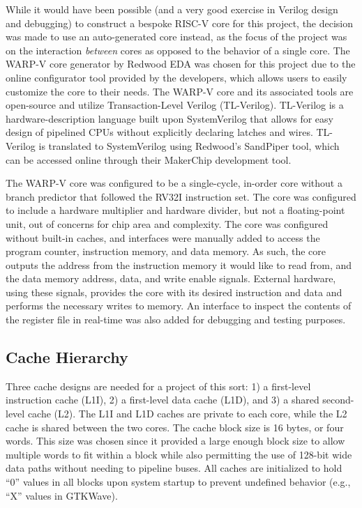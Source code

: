 \documentclass[10pt, compsoc]{IEEEtran}
\begin{document}
While it would have been possible (and a very good exercise in Verilog design and debugging) to construct a bespoke RISC-V core for this project, the decision was made to use an auto-generated core instead, as the focus of the project was on the interaction \textit{between} cores as opposed to the behavior of a single core. The WARP-V core generator by Redwood EDA \cite{warpv} was chosen for this project due to the online configurator tool provided by the developers, which allows users to easily customize the core to their needs. The WARP-V core and its associated tools are open-source and utilize Transaction-Level Verilog (TL-Verilog). TL-Verilog \cite{tlx} is a hardware-description language built upon SystemVerilog that allows for easy design of pipelined CPUs without explicitly declaring latches and wires. TL-Verilog is translated to SystemVerilog using Redwood's SandPiper tool, which can be accessed online through their MakerChip development tool. 



The WARP-V core was configured to be a single-cycle, in-order core without a branch predictor that followed the RV32I instruction set. The core was configured to include a hardware multiplier and hardware divider, but not a floating-point unit, out of concerns for chip area and complexity. The core was configured without built-in caches, and interfaces were manually added to access the program counter, instruction memory, and data memory. As such, the core outputs the address from the instruction memory it would like to read from, and the data memory address, data, and write enable signals. External hardware, using these signals, provides the core with its desired instruction and data and performs the necessary writes to memory. An interface to inspect the contents of the register file in real-time was also added for debugging and testing purposes. 



\subsection{Cache Hierarchy}

Three cache designs are needed for a project of this sort: 1) a first-level instruction cache (L1I), 2) a first-level data cache (L1D), and 3) a shared second-level cache (L2). The L1I and L1D caches are private to each core, while the L2 cache is shared between the two cores. The cache block size is 16 bytes, or four words. This size was chosen since it provided a large enough block size to allow multiple words to fit within a block while also permitting the use of 128-bit wide data paths without needing to pipeline buses. All caches are initialized to hold ``0'' values in all blocks upon system startup to prevent undefined behavior (e.g., ``X'' values in GTKWave).
\end{document}

